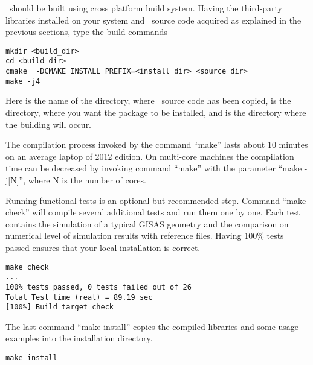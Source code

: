 \BornAgain\ should be built using  cross platform build system. 
Having the third-party libraries installed on your system and
\BornAgain\ source code acquired as explained in the
previous sections, type the build commands
\begin{lstlisting}[language=shell, style=commandline]
mkdir <build_dir>
cd <build_dir>
cmake  -DCMAKE_INSTALL_PREFIX=<install_dir> <source_dir>
make -j4
\end{lstlisting}
\vspace*{3mm}

Here  is the name of the directory, where \BornAgain\ source code has been
copied,  is the directory, where you want the package
to be installed, and  is the directory where the building will occur.



The compilation process invoked by the command ``make'' lasts about 10 minutes on an average laptop
of 2012 edition. On multi-core machines the compilation time  can be decreased by invoking command
``make'' with the parameter ``make -j[N]'', where N is the number of cores.

Running functional tests is an optional but recommended step. Command ``make check''
will compile several additional tests and run them one by one. Each test contains
the simulation of a typical GISAS geometry and the comparison on numerical level of simulation results with reference files. Having 100\% tests passed ensures that your local installation
is correct.
\begin{lstlisting}[language=shell, style=commandline]
make check
...
100% tests passed, 0 tests failed out of 26
Total Test time (real) = 89.19 sec
[100%] Build target check
\end{lstlisting}
\vspace*{3mm}


The last command ``make install'' copies the compiled libraries and some usage examples
into  the installation directory.
\begin{lstlisting}[language=shell, style=commandline]
make install
\end{lstlisting}

